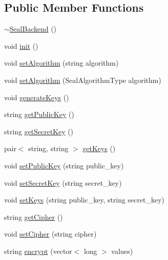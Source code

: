\subsection*{Public Member Functions}
\begin{DoxyCompactItemize}
\item 
\mbox{\hyperlink{classhomomorphine_1_1_seal_backend_a7224092a19a3472a5143d16b80fb9775}{$\sim$\+Seal\+Backend}} ()
\item 
void \mbox{\hyperlink{classhomomorphine_1_1_seal_backend_a106556100ae5f2e9dadfa9fc64603d94}{init}} ()
\item 
void \mbox{\hyperlink{classhomomorphine_1_1_seal_backend_a46a336bca80c5450a1f3ea1125d0d0e8}{set\+Algorithm}} (string algorithm)
\item 
void \mbox{\hyperlink{classhomomorphine_1_1_seal_backend_a6fe83c3f4e6610888e2cf4c6b9717ede}{set\+Algorithm}} (Seal\+Algorithm\+Type algorithm)
\item 
void \mbox{\hyperlink{classhomomorphine_1_1_seal_backend_a1e2ed46b896d4a5b5d930ec7bcd3207b}{generate\+Keys}} ()
\item 
string \mbox{\hyperlink{classhomomorphine_1_1_seal_backend_aa2dce269303eaa73c62dbfacce66dc1a}{get\+Public\+Key}} ()
\item 
string \mbox{\hyperlink{classhomomorphine_1_1_seal_backend_a8ad57a68eb8a02d162ba439046565471}{get\+Secret\+Key}} ()
\item 
pair$<$ string, string $>$ \mbox{\hyperlink{classhomomorphine_1_1_seal_backend_a30358e6405e2d1470468cf55aefb3f4d}{get\+Keys}} ()
\item 
void \mbox{\hyperlink{classhomomorphine_1_1_seal_backend_a6d34008acb06ff1d6743f9163fcd41fb}{set\+Public\+Key}} (string public\+\_\+key)
\item 
void \mbox{\hyperlink{classhomomorphine_1_1_seal_backend_aa9fd3331b2c710e8fdfc3385bbf11eb5}{set\+Secret\+Key}} (string secret\+\_\+key)
\item 
void \mbox{\hyperlink{classhomomorphine_1_1_seal_backend_a42afcc2823d616edc6be0e3950cf7196}{set\+Keys}} (string public\+\_\+key, string secret\+\_\+key)
\item 
string \mbox{\hyperlink{classhomomorphine_1_1_seal_backend_a0917c586791e74b83f4ca0932e5e4d8e}{get\+Cipher}} ()
\item 
void \mbox{\hyperlink{classhomomorphine_1_1_seal_backend_a866b58e41809d68d4c6ed8c3afb27712}{set\+Cipher}} (string cipher)
\item 
string \mbox{\hyperlink{classhomomorphine_1_1_seal_backend_a0c9f992fb7626e55ad0bbfcc068e8e43}{encrypt}} (vector$<$ long $>$ values)

\end{DoxyCompactItemize}
